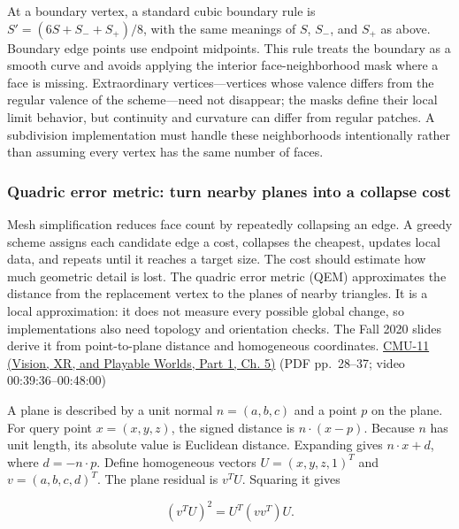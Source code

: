 At a boundary vertex, a standard cubic boundary rule is \(S'=(6S+S_-+S_+)/8\), with the same meanings of \(S\), \(S_-\), and \(S_+\) as above. Boundary edge points use endpoint midpoints. This rule treats the boundary as a smooth curve and avoids applying the interior face-neighborhood mask where a face is missing. Extraordinary vertices---vertices whose valence differs from the regular valence of the scheme---need not disappear; the masks define their local limit behavior, but continuity and curvature can differ from regular patches. A subdivision implementation must handle these neighborhoods intentionally rather than assuming every vertex has the same number of faces.

\subsubsection{Quadric error metric: turn nearby planes into a collapse cost}\label{03-visual-computing-i-ch002-quadric-error-metric-turn-nearby-planes-into-a-collapse-cost}

\hypertarget{03-visual-computing-i-ch002-quadric-error-metric-turn-nearby-planes-into-a-collapse-cost}{}

Mesh simplification reduces face count by repeatedly collapsing an edge. A greedy scheme assigns each candidate edge a cost, collapses the cheapest, updates local data, and repeats until it reaches a target size. The cost should estimate how much geometric detail is lost. The quadric error metric (QEM) approximates the distance from the replacement vertex to the planes of nearby triangles. It is a local approximation: it does not measure every possible global change, so implementations also need topology and orientation checks. The Fall 2020 slides derive it from point-to-plane distance and homogeneous coordinates. \href{../07-Vision-XR-and-Playable-Worlds-P01/main.pdf\#nameddest=04-visual-computing-ii-ch036-cmu-11---digital-geometry-processing}{CMU-11 (Vision, XR, and Playable Worlds, Part 1, Ch. 5)} (PDF pp.~28--37; video 00:39:36--00:48:00)

A plane is described by a unit normal \(n=(a,b,c)\) and a point \(p\) on the plane. For query point \(x=(x,y,z)\), the signed distance is \(n\cdot(x-p)\). Because \(n\) has unit length, its absolute value is Euclidean distance. Expanding gives \(n\cdot x+d\), where \(d=-n\cdot p\). Define homogeneous vectors \(U=(x,y,z,1)^T\) and \(v=(a,b,c,d)^T\). The plane residual is \(v^TU\). Squaring it gives

\[
(v^TU)^2=U^T(vv^T)U.
\]

